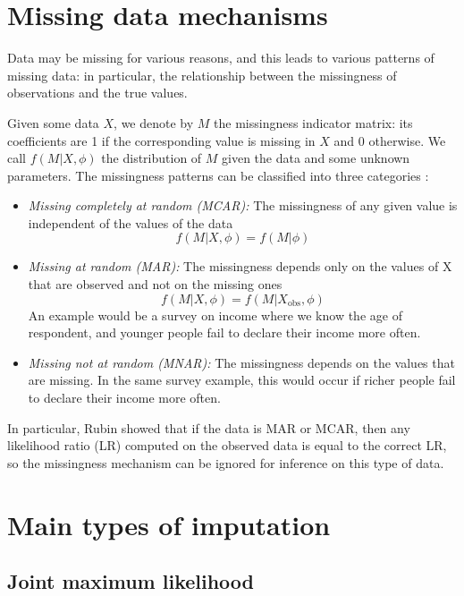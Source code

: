 	\section{Missing data mechanisms}
	Data may be missing for various reasons, and this leads to various patterns of missing data: in particular, the relationship between the missingness of observations and the true values. 
	
	Given some data $X$, we denote by $M$ the missingness indicator matrix: its coefficients are 1 if the corresponding value is missing in $X$ and 0 otherwise. We call $f(M \vert X, \phi)$ the distribution of $M$ given the data and some unknown parameters. The missingness patterns can be classified into three categories \cite[Ch.\ 1]{Rubin_missdata}:
	
\begin{itemize}
	\item \emph{Missing completely at random (MCAR):} The missingness of any given value is independent of the values of the data
	$$ f(M \vert X, \phi) = f(M \vert \phi)$$
	\item \emph{Missing at random (MAR):} The missingness depends only on the values of X that are observed and not on the missing ones
	$$f(M \vert X, \phi) = f(M \vert X_{\text{obs}}, \phi)$$
	An example would be a survey on income where we know the age of respondent, and younger people fail to declare their income more often.
	\item \emph{Missing not at random (MNAR):} The missingness depends on the values that are missing. In the same survey example, this would occur if richer people fail to declare their income more often.
\end{itemize}

In particular, Rubin showed \cite{rubin1976ignorable} that if the data is MAR or MCAR, then any likelihood ratio (LR) computed on the observed data is equal to the correct LR, so the missingness mechanism can be ignored for inference on this type of data.

	\section{Main types of imputation}
		\subsection{Joint maximum likelihood}
